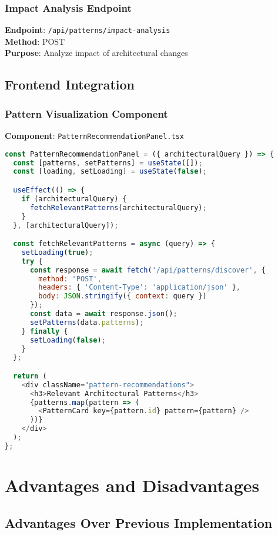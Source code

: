 \documentclass[12pt,a4paper]{article}
\begin{document}
\subsubsection{Impact Analysis Endpoint}
\textbf{Endpoint}: \texttt{/api/patterns/impact-analysis}\\
\textbf{Method}: POST\\
\textbf{Purpose}: Analyze impact of architectural changes

\subsection{Frontend Integration}

\subsubsection{Pattern Visualization Component}
\textbf{Component}: \texttt{PatternRecommendationPanel.tsx}

\begin{lstlisting}[language=JavaScript,caption=Pattern Recommendation UI]
const PatternRecommendationPanel = ({ architecturalQuery }) => {
  const [patterns, setPatterns] = useState([]);
  const [loading, setLoading] = useState(false);

  useEffect(() => {
    if (architecturalQuery) {
      fetchRelevantPatterns(architecturalQuery);
    }
  }, [architecturalQuery]);

  const fetchRelevantPatterns = async (query) => {
    setLoading(true);
    try {
      const response = await fetch('/api/patterns/discover', {
        method: 'POST',
        headers: { 'Content-Type': 'application/json' },
        body: JSON.stringify({ context: query })
      });
      const data = await response.json();
      setPatterns(data.patterns);
    } finally {
      setLoading(false);
    }
  };

  return (
    <div className="pattern-recommendations">
      <h3>Relevant Architectural Patterns</h3>
      {patterns.map(pattern => (
        <PatternCard key={pattern.id} pattern={pattern} />
      ))}
    </div>
  );
};
\end{lstlisting}

\section{Advantages and Disadvantages}

\subsection{Advantages Over Previous Implementation}
\end{document}

